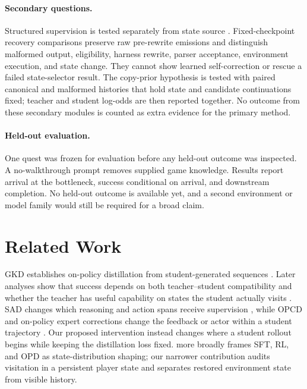 \documentclass[11pt,a4paper]{article}
\begin{document}
\paragraph{Secondary questions.}
Structured supervision is tested separately from state source
\citep{liu2026sad}. Fixed-checkpoint recovery comparisons preserve raw
pre-rewrite emissions and distinguish malformed output, eligibility, harness
rewrite, parser acceptance, environment execution, and state change. They
cannot show learned self-correction or rescue a failed state-selector result.
The copy-prior hypothesis is tested with paired canonical and malformed
histories that hold state and candidate continuations fixed; teacher and student
log-odds are then reported together. No outcome from these secondary modules is
counted as extra evidence for the primary method.

\paragraph{Held-out evaluation.}
One quest was frozen for evaluation before any held-out outcome was inspected.
A no-walkthrough prompt removes supplied game knowledge. Results report
arrival at the bottleneck, success conditional on arrival, and downstream
completion. No held-out outcome is available yet, and a second environment or
model family would still be required for a broad claim.

\section{Related Work}

GKD establishes on-policy distillation from student-generated sequences
\citep{agarwal2024gkd}. Later analyses show that success depends on both
teacher--student compatibility and whether the teacher has useful capability on
states the student actually visits \citep{li2026rethinking}. SAD changes which
reasoning and action spans receive supervision \citep{liu2026sad}, while OPCD
and on-policy expert corrections change the feedback or actor within a student
trajectory \citep{ye2026opcd,lauffer2025oec}. Our proposed intervention instead
changes where a student rollout begins while keeping the distillation loss
fixed. \citet{nie2026states} more broadly frames SFT, RL, and OPD as
state-distribution shaping; our narrower contribution audits visitation in a
persistent player state and separates restored environment state from visible
history.
\end{document}
